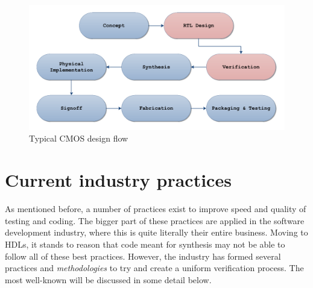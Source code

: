 \documentclass[11pt,british]{article}
\begin{document}
\begin{figure}[h]
    \centering
	\includegraphics[width=\textwidth]{images/VHDLflow.pdf}
    \caption{Typical CMOS design flow}
    \label{fig:Design_Flow}
\end{figure}

\newpage

\section{Current industry practices}
\label{sec:industry}
As mentioned before, a number of practices exist to improve speed and quality of testing and coding. The bigger part of these practices are applied in the software development industry, where this is quite literally their entire business. Moving to \gls{HDL}s, it stands to reason that code meant for synthesis may not be able to follow all of these best practices. However, the industry has formed several practices and \emph{methodologies} to try and create a uniform verification process. The most well-known will be discussed in some detail below.
\end{document}
